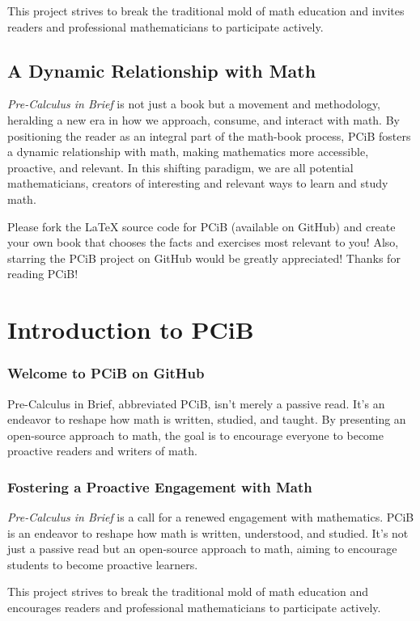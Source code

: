 \documentclass[a4paper,12pt]{book}
\begin{document}
This project strives to break the traditional mold of math education and invites readers and professional mathematicians to participate actively.

\section*{A Dynamic Relationship with Math}
\emph{Pre-Calculus in Brief} is not just a book but a movement and methodology, heralding a new era in how we approach, consume, and interact with math. By positioning the reader as an integral part of the math-book process, PCiB fosters a dynamic relationship with math, making mathematics more accessible, proactive, and relevant. In this shifting paradigm, we are all potential mathematicians, creators of interesting and relevant ways to learn and study math.

Please fork the LaTeX source code for PCiB (available on GitHub) and create your own book that chooses the facts and exercises most relevant to you! Also, starring the PCiB project on GitHub would be greatly appreciated! Thanks for reading PCiB!

\chapter{Introduction to PCiB}
\subsection*{Welcome to PCiB on GitHub}
Pre-Calculus in Brief, abbreviated PCiB, isn't merely a passive read. It's an endeavor to reshape how math is written, studied, and taught. By presenting an open-source approach to math, the goal is to encourage everyone to become proactive readers and writers of math. 

\subsection*{Fostering a Proactive Engagement with Math}

\emph{Pre-Calculus in Brief} is a call for a renewed engagement with mathematics. PCiB is an endeavor to reshape how math is written, understood, and studied. It's not just a passive read but an open-source approach to math, aiming to encourage students to become proactive learners.

This project strives to break the traditional mold of math education and encourages readers and professional mathematicians to participate actively.
\end{document}
